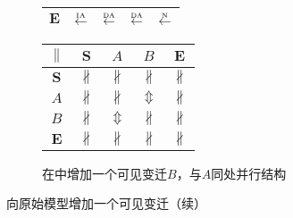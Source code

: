 \begin{figure}[htbp]
\begin{subfigure}{1\textwidth}
\begin{minipage}[b]{0.3\textwidth}
\begin{tabular}{|c|c|c|c|c|}
        $\bm{E}$ & $\overset{\text{\tiny{IA}}}{\leftarrow}$ & $\overset{\text{\tiny{DA}}}{\leftarrow}$ & $\overset{\text{\tiny{DA}}}{\leftarrow}$ & $\overset{\text{\tiny{N}}}{\leftarrow}$\\ \hline
      \end{tabular}
    \end{minipage}
    \begin{minipage}[b]{0.3\textwidth}
      \vspace{1em}
      \centering
      \begin{tabular}{|c|c|c|c|c|} \hline
        $\parallel$ & $\bm{S}$ & $A$ & $B$ & $\bm{E}$\\ \hline
        $\bm{S}$ & $\nparallel$ & $\nparallel$ & $\nparallel$ & $\nparallel$\\ \hline
        $A$ & $\nparallel$ & $\nparallel$ & $\Updownarrow$ & $\nparallel$\\ \hline
        $B$ & $\nparallel$ & $\Updownarrow$ & $\nparallel$ & $\nparallel$\\ \hline
        $\bm{E}$ & $\nparallel$ & $\nparallel$ & $\nparallel$ & $\nparallel$\\ \hline
      \end{tabular}
    \end{minipage}
    \caption{在中增加一个可见变迁$B$，与$A$同处并行结构}
    \label{fig:uniqueness_2_f}
  \end{subfigure}

  \vspace{6pt}
  \caption{向原始模型增加一个可见变迁（续）}
  \label{fig:uniqueness_2}
\end{figure}

